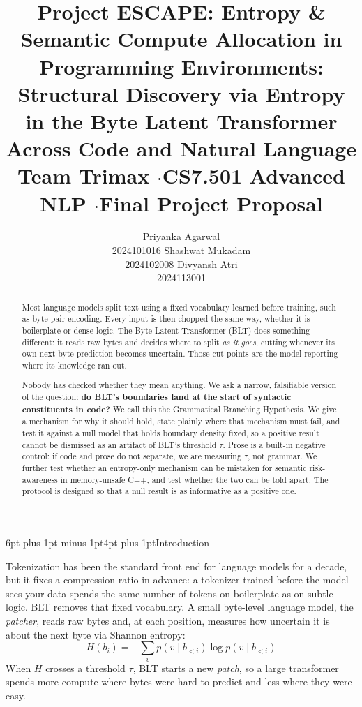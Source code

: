 \documentclass[10pt]{article}
\title{\textbf{Project ESCAPE}: Entropy \& Semantic Compute Allocation in
Programming Environments: Structural Discovery via Entropy in the Byte Latent
Transformer Across Code and Natural Language \\[6pt]
{\normalsize\normalfont Team Trimax \quad$\cdot$\quad CS7.501 Advanced NLP \quad$\cdot$\quad Final Project Proposal}}
\author{
  Priyanka Agarwal\\ 2024101016
  \And Shashwat Mukadam\\ 2024102008
  \And Divyansh Atri\\ 2024113001
}
\makeatletter
\renewcommand\section{\@startsection{section}{1}{0pt}%
  {6pt plus 1pt minus 1pt}{4pt plus 1pt}{\normalfont\large\bfseries}}
\makeatother
\begin{document}
\maketitle

\begin{abstract}
\noindent
Most language models split text using a fixed vocabulary learned before training,
such as byte-pair encoding. Every input is then chopped the same way, whether it
is boilerplate or dense logic. The Byte Latent Transformer (BLT)
\citep{pagnoni2024blt} does something different: it reads raw bytes and decides
where to split \emph{as it goes}, cutting whenever its own next-byte prediction
becomes uncertain. Those cut points are the model reporting where its knowledge
ran out.

Nobody has checked whether they mean anything. We ask a narrow, falsifiable
version of the question: \textbf{do BLT's boundaries land at the start of
syntactic constituents in code?} We call this the Grammatical Branching
Hypothesis. We give a mechanism for why it should hold, state plainly where that
mechanism must fail, and test it against a null model that holds boundary density
fixed, so a positive result cannot be dismissed as an artifact of BLT's
threshold $\tau$. Prose is a built-in negative control: if code and prose do not
separate, we are measuring $\tau$, not grammar. We further test whether an
entropy-only mechanism can be mistaken for semantic risk-awareness in
memory-unsafe C++, and test whether the two can be told apart. The protocol is
designed so that a null result is as informative as a positive one.
\end{abstract}

\section{Introduction}

Tokenization has been the standard front end for language models for a decade,
but it fixes a compression ratio in advance: a tokenizer trained before the
model sees your data spends the same number of tokens on boilerplate as on
subtle logic. BLT removes that fixed vocabulary. A small byte-level language
model, the \emph{patcher}, reads raw bytes and, at each position,
measures how uncertain it is about the next byte via Shannon entropy:
\begin{equation}
H(b_i) = -\sum_v p(v \mid b_{<i}) \log p(v \mid b_{<i})
\label{eq:entropy}
\end{equation}
When $H$ crosses a threshold $\tau$, BLT starts a new \emph{patch}, so a large
transformer spends more compute where bytes were hard to predict and less where
they were easy.
\end{document}

